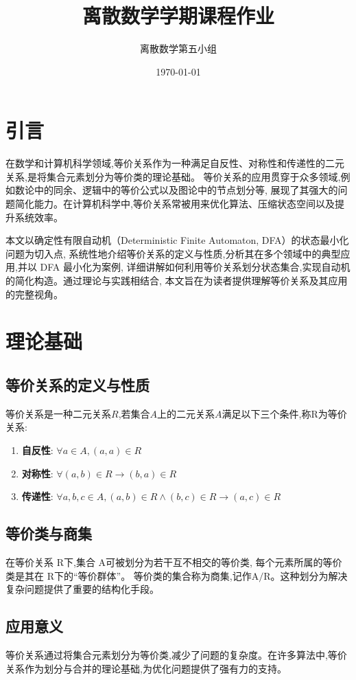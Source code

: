 \documentclass{article}
\title{离散数学学期课程作业}
\author{离散数学第五小组}
\date{\today}
\begin{document}
\maketitle

\section{引言}


    在数学和计算机科学领域,等价关系作为一种满足自反性、对称性和传递性的二元关系,是将集合元素划分为等价类的理论基础。
等价关系的应用贯穿于众多领域,例如数论中的同余、逻辑中的等价公式以及图论中的节点划分等,
展现了其强大的问题简化能力。在计算机科学中,等价关系常被用来优化算法、压缩状态空间以及提升系统效率。

    本文以确定性有限自动机（Deterministic Finite Automaton, DFA）的状态最小化问题为切入点,
系统性地介绍等价关系的定义与性质,分析其在多个领域中的典型应用,并以 DFA 最小化为案例,
详细讲解如何利用等价关系划分状态集合,实现自动机的简化构造。通过理论与实践相结合,
本文旨在为读者提供理解等价关系及其应用的完整视角。

\newpage
\section{理论基础}
\subsection{等价关系的定义与性质}
    等价关系是一种二元关系$R$,若集合$A$上的二元关系$A$满足以下三个条件,称$\mathrm{R}$为等价关系:
\begin{enumerate}
    \item \textbf{自反性}: $\forall a \in A, (a,a) \in R$
    \item \textbf{对称性}: $\forall (a,b)\in R \rightarrow (b,a) \in R $
    \item \textbf{传递性}: $\forall a,b,c \in A, (a,b) \in R \wedge (b,c) \in R \rightarrow (a,c) \in R$
\end{enumerate}
\subsection{等价类与商集}
在等价关系 $\mathrm{R}$下,集合 $\mathrm{A}$可被划分为若干互不相交的等价类,
每个元素所属的等价类是其在 $\mathrm{R}$下的“等价群体”。
等价类的集合称为商集,记作$\mathrm{A}/\mathrm{R}$。这种划分为解决复杂问题提供了重要的结构化手段。

\subsection{应用意义}
等价关系通过将集合元素划分为等价类,减少了问题的复杂度。在许多算法中,等价关系作为划分与合并的理论基础,为优化问题提供了强有力的支持。
\end{document}
